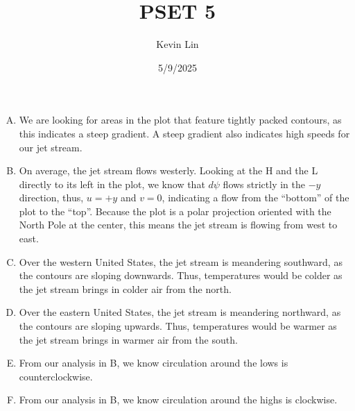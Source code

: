 \documentclass[11pt,a4paper,margin=1in]{article}
\title{PSET 5}
\author{Kevin Lin}
\date{5/9/2025}
\begin{document}
\maketitle
\section{}
\begin{enumerate}[A.]
    \item 
    We are looking for areas in the plot that feature tightly packed contours,
    as this indicates a steep gradient. A steep gradient also indicates high speeds
    for our jet stream.
    \item 
    On average, the jet stream flows westerly. Looking at the H and the L directly 
    to its left in the plot, we know that $d\psi$ flows strictly in the $-y$ direction, 
    thus, $u = +y$ and $v = 0$, indicating a flow from the ``bottom'' of the plot
    to the ``top''. Because the plot is a polar projection oriented with the North 
    Pole at the center, this means the jet stream is flowing from west to east. 
    \item 
    Over the western United States, the jet stream is meandering southward, as
    the contours are sloping downwards. Thus, temperatures would be colder as 
    the jet stream brings in colder air from the north.
    \item 
    Over the eastern United States, the jet stream is meandering northward, as
    the contours are sloping upwards. Thus, temperatures would be warmer as
    the jet stream brings in warmer air from the south.
    \item 
    From our analysis in B, we know circulation around the lows is counterclockwise.
    \item 
    From our analysis in B, we know circulation around the highs is clockwise.
\end{enumerate}
\end{document}
